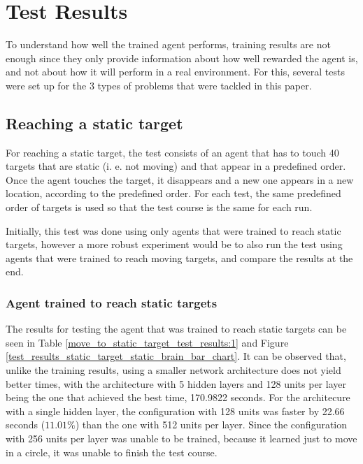 \chapter{Test Results}

To understand how well the trained agent performs, training results are not enough since they only provide information about how well rewarded the agent is, and not about how it will perform in a real environment. For this, several tests were set up for the 3 types of problems that were tackled in this paper.


\section{Reaching a static target} \label{test_reach_static_target}

For reaching a static target, the test consists of an agent that has to touch 40 targets that are static (i. e. not moving) and that appear in a predefined order. Once the agent touches the target, it disappears and a new one appears in a new location, according to the predefined order. For each test, the same predefined order of targets is used so that the test course is the same for each run. 

Initially, this test was done using only agents that were trained to reach static targets, however a more robust experiment would be to also run the test using agents that were trained to reach moving targets, and compare the results at the end.


\subsection{Agent trained to reach static targets}

The results for testing the agent that was trained to reach static targets can be seen in Table \ref{move_to_static_target_test_results:1} and Figure \ref{test_results_static_target_static_brain_bar_chart}. It can be observed that, unlike the training results, using a smaller network architecture does not yield better times, with the architecture with 5 hidden layers and 128 units per layer being the one that achieved the best time, 170.9822 seconds. For the architecure with a single hidden layer, the configuration with 128 units was faster by 22.66 seconds ($11.01\%$) than the one with 512 units per layer. Since the configuration with 256 units per layer was unable to be trained, because it learned just to move in a circle, it was unable to finish the test course.

